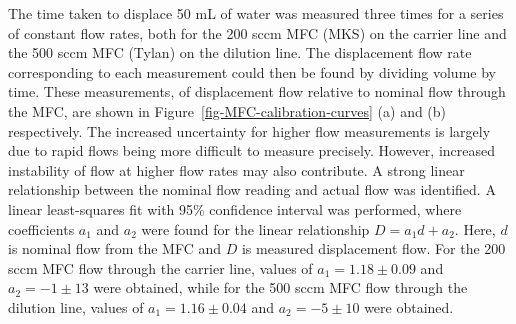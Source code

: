\documentclass[
  a4paper,
]{scrbook}
\begin{document}
The time taken to displace 50 mL of water was measured three times for a
series of constant flow rates, both for the 200 sccm MFC (MKS) on the
carrier line and the 500 sccm MFC (Tylan) on the dilution line. The
displacement flow rate corresponding to each measurement could then be
found by dividing volume by time. These measurements, of displacement
flow relative to nominal flow through the MFC, are shown in
Figure~\ref{fig-MFC-calibration-curves} (a) and (b) respectively. The
increased uncertainty for higher flow measurements is largely due to
rapid flows being more difficult to measure precisely. However,
increased instability of flow at higher flow rates may also contribute.
A strong linear relationship between the nominal flow reading and actual
flow was identified. A linear least-squares fit with 95\% confidence
interval was performed, where coefficients \(a_1\) and \(a_2\) were
found for the linear relationship \(D = a_1d + a_2\). Here, \(d\) is
nominal flow from the MFC and \(D\) is measured displacement flow. For
the 200 sccm MFC flow through the carrier line, values of
\(a_1 = 1.18 \pm 0.09\) and \(a_2 = -1 \pm 13\) were obtained, while for
the 500 sccm MFC flow through the dilution line, values of
\(a_1 = 1.16 \pm 0.04\) and \(a_2 = -5 \pm 10\) were obtained.
\end{document}
